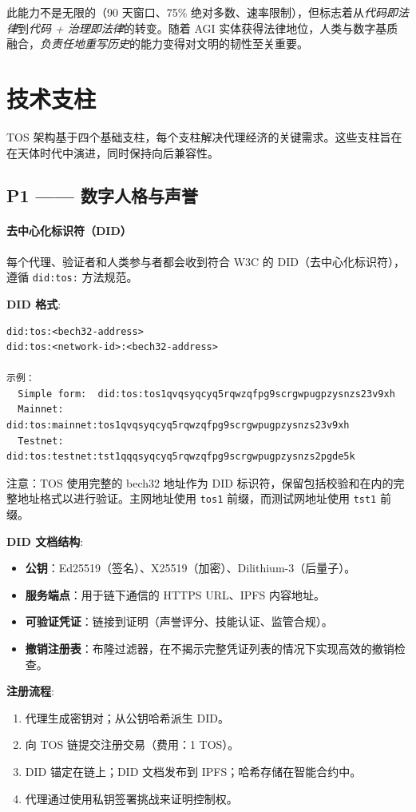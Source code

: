 \documentclass[11pt]{article}
\begin{document}
此能力不是无限的（90 天窗口、75\% 绝对多数、速率限制），但标志着从\emph{代码即法律}到\emph{代码 + 治理即法律}的转变。随着 AGI 实体获得法律地位，人类与数字基质融合，\emph{负责任地重写历史}的能力变得对文明的韧性至关重要。

\section{技术支柱}

TOS 架构基于四个基础支柱，每个支柱解决代理经济的关键需求。这些支柱旨在在天体时代中演进，同时保持向后兼容性。

\subsection{P1 —— 数字人格与声誉}
\label{sec:pillar-identity}

\paragraph{去中心化标识符（DID）}
每个代理、验证者和人类参与者都会收到符合 W3C 的 DID（去中心化标识符），遵循 \texttt{did:tos:} 方法规范。

\textbf{DID 格式}:
\begin{verbatim}
did:tos:<bech32-address>
did:tos:<network-id>:<bech32-address>

示例：
  Simple form:  did:tos:tos1qvqsyqcyq5rqwzqfpg9scrgwpugpzysnzs23v9xh
  Mainnet:      did:tos:mainnet:tos1qvqsyqcyq5rqwzqfpg9scrgwpugpzysnzs23v9xh
  Testnet:      did:tos:testnet:tst1qqqsyqcyq5rqwzqfpg9scrgwpugpzysnzs2pgde5k
\end{verbatim}
注意：TOS 使用完整的 bech32 地址作为 DID 标识符，保留包括校验和在内的完整地址格式以进行验证。主网地址使用 \texttt{tos1} 前缀，而测试网地址使用 \texttt{tst1} 前缀。

\textbf{DID 文档结构}:
\begin{itemize}[noitemsep]
  \item \textbf{公钥}：Ed25519（签名）、X25519（加密）、Dilithium-3（后量子）。
  \item \textbf{服务端点}：用于链下通信的 HTTPS URL、IPFS 内容地址。
  \item \textbf{可验证凭证}：链接到证明（声誉评分、技能认证、监管合规）。
  \item \textbf{撤销注册表}：布隆过滤器，在不揭示完整凭证列表的情况下实现高效的撤销检查。
\end{itemize}

\textbf{注册流程}:
\begin{enumerate}[noitemsep]
  \item 代理生成密钥对；从公钥哈希派生 DID。
  \item 向 TOS 链提交注册交易（费用：1 TOS）。
  \item DID 锚定在链上；DID 文档发布到 IPFS；哈希存储在智能合约中。
  \item 代理通过使用私钥签署挑战来证明控制权。
\end{enumerate}
\end{document}
